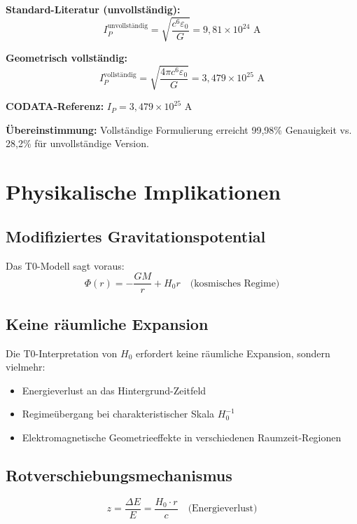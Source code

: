 \documentclass[12pt,a4paper]{article}
\begin{document}
	\textbf{Standard-Literatur (unvollständig):}
	\begin{equation}
		I_P^{\text{unvollständig}} = \sqrt{\frac{c^6\varepsilon_0}{G}} = 9{,}81 \times 10^{24} \text{ A}
	\end{equation}
	
	\textbf{Geometrisch vollständig:}
	\begin{equation}
		I_P^{\text{vollständig}} = \sqrt{\frac{4\pi c^6\varepsilon_0}{G}} = 3{,}479 \times 10^{25} \text{ A}
	\end{equation}
	
	\textbf{CODATA-Referenz:} $I_P = 3{,}479 \times 10^{25}$ A
	
	\textbf{Übereinstimmung:} Vollständige Formulierung erreicht 99{,}98\% Genauigkeit vs. 28{,}2\% für unvollständige Version.
	
	\section{Physikalische Implikationen}
	
	\subsection{Modifiziertes Gravitationspotential}
	Das T0-Modell sagt voraus:
	\begin{equation}
		\Phi(r) = -\frac{GM}{r} + H_0 r \quad \text{(kosmisches Regime)}
	\end{equation}
	
	\subsection{Keine räumliche Expansion}
	Die T0-Interpretation von $H_0$ erfordert keine räumliche Expansion, sondern vielmehr:
	\begin{itemize}
		\item Energieverlust an das Hintergrund-Zeitfeld
		\item Regimeübergang bei charakteristischer Skala $H_0^{-1}$
		\item Elektromagnetische Geometrieeffekte in verschiedenen Raumzeit-Regionen
	\end{itemize}
	
	\subsection{Rotverschiebungsmechanismus}
	\begin{equation}
		z = \frac{\Delta E}{E} = \frac{H_0 \cdot r}{c} \quad \text{(Energieverlust)}
	\end{equation}
	
\end{document}
